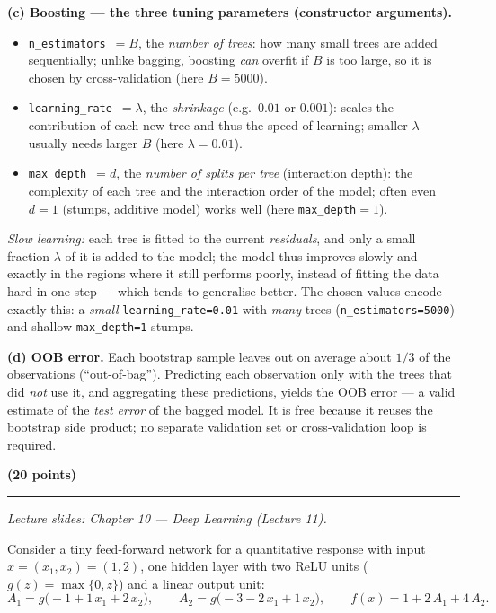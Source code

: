 \documentclass[11pt,a4paper]{article}
\newcommand{\problem}[2]{\par\vspace{7mm}\noindent{\large\textbf{Problem #1}}%
  \hfill{\large\textbf{(#2 points)}}\par\nopagebreak\vspace{0.6mm}%
  \noindent\rule{\textwidth}{0.6pt}\par\nopagebreak\vspace{2.5mm}}
\begin{document}
\begin{solutionbox}
\medskip
\textbf{(c) Boosting --- the three tuning parameters (constructor arguments).}
\begin{itemize}[nosep,leftmargin=5mm]
  \item \texttt{n\_estimators}~$=B$, the \emph{number of trees}: how many small trees are added
    sequentially; unlike bagging, boosting \emph{can} overfit if $B$ is too large, so it is
    chosen by cross-validation (here $B=5000$).
  \item \texttt{learning\_rate}~$=\lambda$, the \emph{shrinkage} (e.g.\ $0.01$ or $0.001$):
    scales the contribution of each new tree and thus the speed of learning; smaller $\lambda$
    usually needs larger $B$ (here $\lambda=0.01$).
  \item \texttt{max\_depth}~$=d$, the \emph{number of splits per tree} (interaction depth): the
    complexity of each tree and the interaction order of the model; often even $d=1$ (stumps,
    additive model) works well (here \texttt{max\_depth}$=1$).
\end{itemize}
\emph{Slow learning:} each tree is fitted to the current \emph{residuals}, and only a small
fraction $\lambda$ of it is added to the model; the model thus improves slowly and exactly in
the regions where it still performs poorly, instead of fitting the data hard in one step ---
which tends to generalise better. The chosen values encode exactly this: a \emph{small}
\texttt{learning\_rate=0.01} with \emph{many} trees (\texttt{n\_estimators=5000}) and shallow
\texttt{max\_depth=1} stumps.

\medskip
\textbf{(d) OOB error.}
Each bootstrap sample leaves out on average about $1/3$ of the observations
(``out-of-bag''). Predicting each observation only with the trees that did \emph{not} use it,
and aggregating these predictions, yields the OOB error --- a valid estimate of the
\emph{test error} of the bagged model. It is free because it reuses the bootstrap side
product; no separate validation set or cross-validation loop is required.
\end{solutionbox}
\fi

\problem{5: Neural networks by hand}{20}
{\small\itshape Lecture slides: Chapter 10 --- Deep Learning (Lecture 11).}\par\vspace{1mm}

Consider a tiny feed-forward network for a quantitative response with input
$x=(x_1,x_2)=(1,2)$, one hidden layer with two ReLU units
($g(z)=\max\{0,z\}$) and a linear output unit:
\[
  A_1=g\bigl(-1+1\,x_1+2\,x_2\bigr),\qquad
  A_2=g\bigl(-3-2\,x_1+1\,x_2\bigr),\qquad
  f(x)=1+2\,A_1+4\,A_2 .
\]
\end{document}
